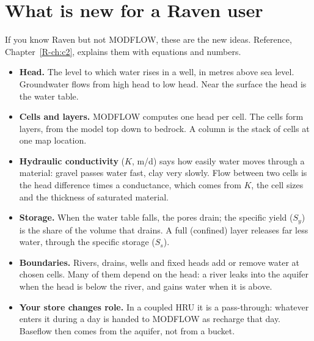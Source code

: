 \section{What is new for a Raven user}\label{sec:newraven}
If you know Raven but not MODFLOW, these are the new ideas. Reference, Chapter~\ref{R-ch:c2}, explains them with
equations and numbers.
\begin{itemize}
\item \textbf{Head.} The level to which water rises in a well, in metres above sea level. Groundwater flows from high
head to low head. Near the surface the head is the water table.
\item \textbf{Cells and layers.} MODFLOW computes one head per cell. The cells form layers, from the model top down to
bedrock. A column is the stack of cells at one map location.
\item \textbf{Hydraulic conductivity} ($K$, m/d) says how easily water moves through a material: gravel passes water
fast, clay very slowly. Flow between two cells is the head difference times a conductance, which comes from $K$, the
cell sizes and the thickness of saturated material.
\item \textbf{Storage.} When the water table falls, the pores drain; the specific yield ($S_y$) is the share of the volume
that drains. A full (confined) layer releases far less water, through the specific storage ($S_s$).
\item \textbf{Boundaries.} Rivers, drains, wells and fixed heads add or remove water at chosen cells. Many of them depend
on the head: a river leaks into the aquifer when the head is below the river, and gains water when it is above.
\item \textbf{Your  store changes role.} In a coupled HRU it is a pass-through: whatever enters it during
a day is handed to MODFLOW as recharge that day. Baseflow then comes from the aquifer, not from a bucket.
\end{itemize}

